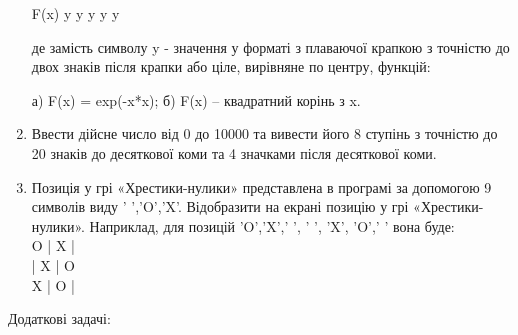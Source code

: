 \documentclass[]{article}
\begin{document}
\begin{enumerate}
F(x)\textbar{} y \textbar{} y \textbar{} y \textbar{} y \textbar{} y

де замість символу y - значення у форматі з плаваючої крапкою з точністю
до двох знаків після крапки або ціле, вирівняне по центру, функцій:

а) F(x) = exp(-x*x); б) F(x) -- квадратний корінь з x.

\item
  Ввести дійсне число від 0 до 10000 та вивести його 8 ступінь з
  точністю до 20 знаків до десяткової коми та 4 значками після
  десяткової коми.

\item
Позиція у  грі «Хрестики-нулики» представлена в програмі за допомогою 9 символів виду ' ','O','X'. 
Відобразити на екрані позицію у грі «Хрестики-нулики». 
Наприклад, для позицій 'O','X',' ', ' ', 'X', 'O',' ' вона буде:\\
O | X | \hspace*{7pt}  \\   
\hspace*{7pt} | X | O \\
X | O | \hspace*{7pt}  \\ 



\end{enumerate}

Додаткові задачі:
\end{document}
